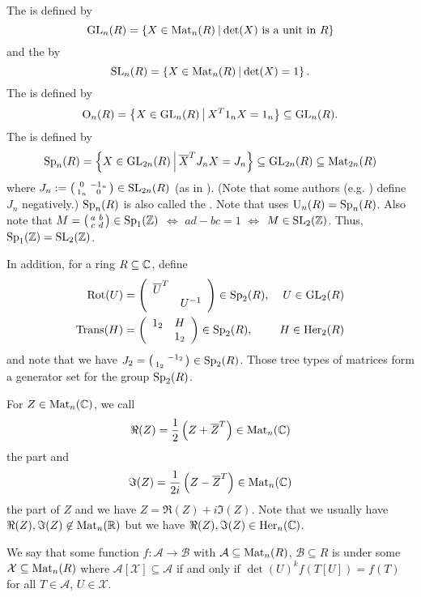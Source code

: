 The  is defined by
\[ \GL_n(R) = \Set{X \in \M_n(R)}{\text{$\det(X)$ is a unit in $R$}} \]
and the  by
\[ \SL_n(R) = \Set{X \in \M_n(R)}{\det(X) = 1} . \] %
The  is defined by
\[ \Orth_n(R) = \Set{X \in \GL_n(R)}{X^T 1_n X = 1_n} \subseteq \GL_n(R) . \] %
The  is defined by
\[ \Sp_n(R) = \Set{X \in \GL_{2n}(R)}{\overline{X}^T J_n X = J_n} \subseteq \GL_{2n}(R) \subseteq \M_{2n}(R) \] %
where $J_n := \left( \begin{smallmatrix} 0 & -1_n \\ 1_n & 0 \end{smallmatrix} \right) \in \operatorname{SL}_{2n}(R)$ (as in \cite{Dern01Herm}). (Note that some authors (e.g. \cite{PoorYuen07Comp}) define $J_n$ negatively.)
$\operatorname{Sp}_n(R)$ is also called the . Note that \cite{Dern01Herm} uses $\operatorname{U}_n(R) = \operatorname{Sp}_n(R)$.
Also note that $M = \left( \begin{smallmatrix} a & b \\ c & d \end{smallmatrix} \right) \in \operatorname{Sp}_1(\mathbb{Z})$ $\Leftrightarrow$ $ad - bc = 1$ $\Leftrightarrow$ $M \in \operatorname{SL}_2(\mathbb{Z})$. Thus, $\operatorname{Sp}_1(\mathbb{Z}) = \operatorname{SL}_2(\mathbb{Z})$. %

In addition, for a ring $R \subseteq \mathbb{C}$, define
\begin{align*}
\operatorname{Rot}(U) & = \left( \begin{array}{cc} \overline{U}^T &  \\  & U^{-1} \end{array} \right) \in \operatorname{Sp}_2(R), & U \in \operatorname{GL}_2(R) \\
\operatorname{Trans}(H) & = \left( \begin{array}{cc} 1_2 & H \\  & 1_2 \end{array} \right) \in \operatorname{Sp}_2(R),  & H \in \operatorname{Her}_2(R)
\end{align*}
and note that we have $J_2 = \left( \begin{smallmatrix}  & -1_2 \\ 1_2 &  \end{smallmatrix} \right) \in \operatorname{Sp}_2(R)$. Those tree types of matrices form a generator set for the group $\operatorname{Sp}_2(R)$.

For $Z \in \operatorname{Mat}_n(\mathbb{C})$, we call
\[ \Re(Z) = \frac{1}{2} \left(Z + \overline{Z}^{T}\right) \in \operatorname{Mat}_n(\mathbb{C}) \]
the  part and
\[ \Im(Z) = \frac{1}{2i} \left(Z - \overline{Z}^{T}\right)  \in \operatorname{Mat}_n(\mathbb{C}) \]
the  part of $Z$ and we have $Z = \Re(Z) + i \Im(Z)$.
Note that we usually have $\Re(Z),\Im(Z) \not\in \operatorname{Mat}_n(\mathbb{R})$ but we have $\Re(Z),\Im(Z) \in \operatorname{Her}_n(\mathbb{C})$.

We say that some function $f \colon \mathcal{A} \rightarrow \mathcal{B}$ with $\mathcal{A} \subseteq \operatorname{Mat}_n(R)$, $\mathcal{B} \subseteq R$ is  under some $\mathcal{X} \subseteq \operatorname{Mat}_n(R)$ where $\mathcal{A}[\mathcal{X}] \subseteq \mathcal{A}$ if and only if $\det(U)^k f(T[U]) = f(T)$ for all $T \in \mathcal{A}$, $U \in \mathcal{X}$.

